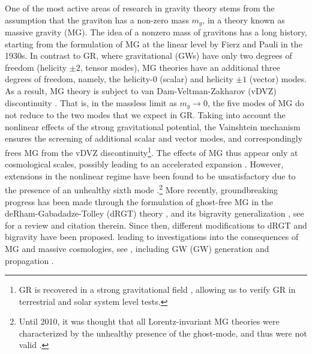 \documentclass[prd,twocolumn,aps,psfig,nofootinbib,nobibnotes,superscriptaddress,preprintnumbers,times]{revtex4-2}
\begin{document}
One of the most active areas of research in gravity theory stems from the assumption that the graviton has a non-zero mass $m_g$, in a theory known as massive gravity (MG). The idea of a nonzero mass of gravitons has a long history, starting from the formulation of MG at the linear level by Fierz and Pauli \cite{Fierz:1939ix} in the 1930s. In contrast to GR, where gravitational (GWs) have only two degrees of freedom (helicity $\pm 2$, tensor modes), MG theories have an additional three degrees of freedom, namely, the helicity-$0$ (scalar) and helicity $\pm 1$ (vector) modes. As a result, MG theory is subject to van Dam-Veltman-Zakharov (vDVZ) discontinuity \cite{vanDam:1970vg,Zakharov:1970cc}. That is, in the massless limit as $m_g \rightarrow 0$, the five modes of MG do not reduce to the two modes that we expect in GR. 
Taking into account the nonlinear effects of the strong gravitational potential, the Vainshtein mechanism \cite{Vainshtein:1972sx} ensures the screening of additional scalar and vector modes, and correspondingly frees MG from the vDVZ discontinuity\footnote{GR is recovered in a strong gravitational field \cite{Tasinato:2013rza}, allowing us to verify GR in terrestrial and solar system level tests.}. The effects of MG thus appear only at cosmological scales, possibly leading to an accelerated expansion \cite{DAmico:2011eto}.
However, extensions in the nonlinear regime have been found to be unsatisfactory due to the presence of an unhealthy sixth mode \cite{Boulware:1972yco}.\footnote{Until 2010, it was thought that all Lorentz-invariant MG theories were characterized by the unhealthy presence of the ghost-mode, and thus were not valid \cite{deRham:2010kj}.}
More recently, groundbreaking progress has been made through the formulation of ghost-free MG in the deRham-Gabadadze-Tolley (dRGT) theory \cite{deRham:2010ik,deRham:2010kj}, and its bigravity generalization \cite{Hassan:2011zd}, see \cite{deRham:2023ngf} for a review and citation therein. Since then, different modifications to dRGT and bigravity have been proposed. 
leading to investigations into the consequences of MG and massive cosmologies, see
\cite{DAmico:2011eto,Gratia:2012wt,Gumrukcuoglu:2012aa,Maeda:2013bha,Akrami:2013pna,Zhang:2013noa,Lambiase:2012fv,Koyama:2011wx,Tasinato:2012ze,Solomon:2014iwa, Akrami:2013ffa,Koennig:2014ods,Gumrukcuoglu:2016hic}, 
including 
GW (GW) generation and propagation \cite{DeFelice:2013awa,Gumrukcuoglu:2013nza,DeFelice:2013bxa,DeFelice:2015moy,Babichev:2015xha,Sakstein:2017bws}. 
\end{document}
